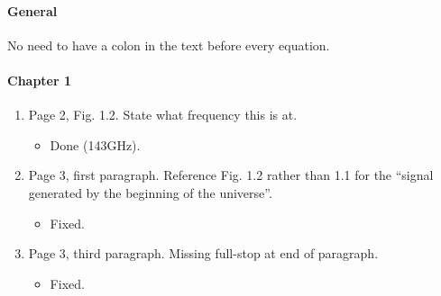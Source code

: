 \documentclass[11pt]{article}
\newcommand{\todo}[1]{{\color{red} #1}}
\begin{document}

\paragraph{General}
\begin{enumerate}
        \todo{%
\item No need to have a colon in the text before every equation.
    }
\end{enumerate}

\paragraph{Chapter 1}
\begin{enumerate}
\item Page 2, Fig. 1.2. State what frequency this is at.
  \begin{itemize}
    \item Done (143GHz).
  \end{itemize}
\item Page 3, first paragraph. Reference Fig. 1.2 rather than 1.1 for
  the ``signal generated by the beginning of the universe''.
  \begin{itemize}
    \item Fixed.
  \end{itemize}
\item Page 3, third paragraph. Missing full-stop at end of paragraph.
  \begin{itemize}
    \item Fixed.
  \end{itemize}
\end{enumerate}
\end{document}
